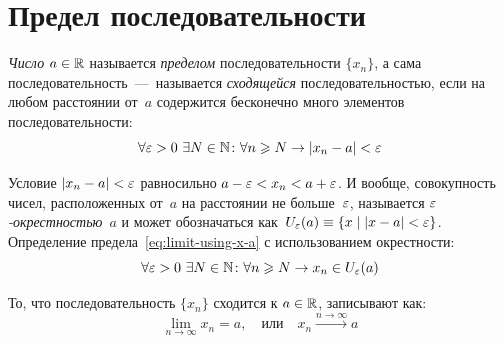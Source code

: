 \documentclass[a4paper,12pt]{article}
\begin{document}
  
  \section{Предел последовательности}\label{seq:limit}
  
  
  
  \emph{Число} $a \hm\in \RR$ называется \emph{пределом} последовательности $\{x_n\}$, а сама последовательность~---~называется \emph{сходящейся} последовательностью, если на любом расстоянии от~$a$ содержится бесконечно много элементов последовательности:
  \begin{equation}\label{eq:limit-using-x-a}
    \forall \varepsilon > 0\ \exists N \in \mathbb N\colon \forall n \geqslant N \to |x_n - a| < \varepsilon
  \end{equation}
  
  Условие $|x_n - a| \hm< \eps$ равносильно $a \hm- \eps \hm< x_n \hm< a \hm+ \eps$.
  И вообще, совокупность чисел, расположенных от~$a$ на расстоянии не больше~$\varepsilon$, называется \emph{$\varepsilon$-окрестностью}~$a$ и может обозначаться как~$U_{\eps}(a) \hm\equiv \{x \hm\mid |x \hm- a| \hm< \eps\}$.
  Определение предела~\eqref{eq:limit-using-x-a} с использованием окрестности:
  \begin{equation}\label{eq:limit-using-eps-nei}
    \forall \varepsilon > 0\ \exists N \in \mathbb N\colon \forall n \geqslant N \to x_n \in U_{\varepsilon}(a)
  \end{equation}
  
  То, что последовательность $\{x_n\}$ сходится к $a \hm\in \RR$, записывают как:
  \[
    \lim_{n \to \infty} x_n = a,\quad \mbox{или}\quad x_n \xrightarrow{n \to \infty} a
  \]
    
\end{document}
